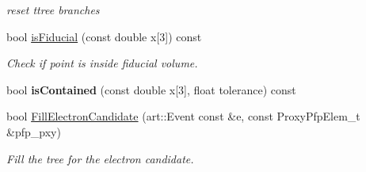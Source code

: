 \begin{DoxyCompactItemize}
\begin{DoxyCompactList}\small\item\em reset ttree branches \end{DoxyCompactList}\item 
bool \hyperlink{classselection_1_1CCincSelection_adf6c627aacf355e0e4c8ff4df5716fee}{is\-Fiducial} (const double x\mbox{[}3\mbox{]}) const 
\begin{DoxyCompactList}\small\item\em Check if point is inside fiducial volume. \end{DoxyCompactList}\item 
\hypertarget{classselection_1_1CCincSelection_a0f7e17ebcdfcb9813b6c3f12bd8eb59d}{bool {\bfseries is\-Contained} (const double x\mbox{[}3\mbox{]}, float tolerance) const }\label{classselection_1_1CCincSelection_a0f7e17ebcdfcb9813b6c3f12bd8eb59d}

\item 
bool \hyperlink{classselection_1_1CCincSelection_a479124737f56d702e4394b83e9d80ccc}{Fill\-Electron\-Candidate} (art\-::\-Event const \&e, const Proxy\-Pfp\-Elem\-\_\-t \&pfp\-\_\-pxy)
\begin{DoxyCompactList}\small\item\em Fill the tree for the electron candidate. \end{DoxyCompactList}\end{DoxyCompactItemize}
